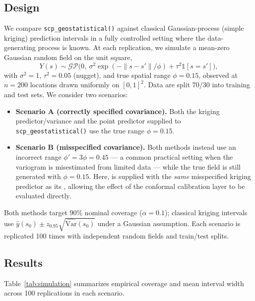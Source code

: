 \documentclass[article]{jss}
\begin{document}
\subsection{Design}

We compare \texttt{scp\_geostatistical()} against classical Gaussian-process (simple kriging) prediction intervals in a fully controlled setting where the data-generating process is known. At each replication, we simulate a mean-zero Gaussian random field on the unit square,
%
\begin{equation} \label{eq:gp}
Y(s) \sim \mathcal{GP}\big(0,\ \sigma^2 \exp(-\|s-s'\|/\phi) + \tau^2 \mathbb{1}[s=s']\big),
\end{equation}
%
with $\sigma^2 = 1$, $\tau^2 = 0.05$ (nugget), and true spatial range $\phi = 0.15$, observed at $n = 200$ locations drawn uniformly on $[0,1]^2$. Data are split 70/30 into training and test sets. We consider two scenarios:
%
\begin{itemize}
  \item \textbf{Scenario A (correctly specified covariance).} Both the kriging predictor/variance and the point predictor supplied to \texttt{scp\_geostatistical()} use the true range $\phi = 0.15$.
  \item \textbf{Scenario B (misspecified covariance).} Both methods instead use an incorrect range $\phi' = 3\phi = 0.45$ --- a common practical setting when the variogram is misestimated from limited data --- while the true field is still generated with $\phi = 0.15$. Here,  is supplied with the \emph{same} misspecified kriging predictor as its , allowing the effect of the conformal calibration layer to be evaluated directly.
\end{itemize}
%
Both methods target 90\% nominal coverage ($\alpha = 0.1$); classical kriging intervals use $\hat{y}(s_0) \pm z_{0.95}\sqrt{\widehat{\mathrm{Var}}(s_0)}$ under a Gaussian assumption. Each scenario is replicated 100 times with independent random fields and train/test splits.

\subsection{Results}

Table~\ref{tab:simulation} summarizes empirical coverage and mean interval width across 100 replications in each scenario.
\end{document}
